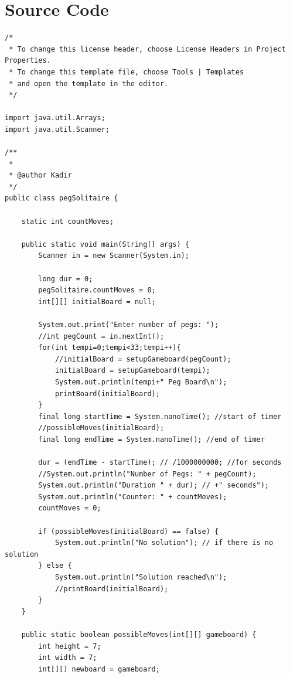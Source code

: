 \documentclass{article}
\begin{document}
\section{Source Code}
\begin{lstlisting}
/*
 * To change this license header, choose License Headers in Project Properties.
 * To change this template file, choose Tools | Templates
 * and open the template in the editor.
 */

import java.util.Arrays;
import java.util.Scanner;

/**
 *
 * @author Kadir
 */
public class pegSolitaire {

    static int countMoves;

    public static void main(String[] args) {
        Scanner in = new Scanner(System.in);

        long dur = 0;
        pegSolitaire.countMoves = 0;
        int[][] initialBoard = null;

        System.out.print("Enter number of pegs: ");
        //int pegCount = in.nextInt();
        for(int tempi=0;tempi<33;tempi++){
            //initialBoard = setupGameboard(pegCount);
            initialBoard = setupGameboard(tempi);
            System.out.println(tempi+" Peg Board\n");
            printBoard(initialBoard);
        }
        final long startTime = System.nanoTime(); //start of timer
        //possibleMoves(initialBoard);
        final long endTime = System.nanoTime(); //end of timer

        dur = (endTime - startTime); // /1000000000; //for seconds
        //System.out.println("Number of Pegs: " + pegCount);
        System.out.println("Duration " + dur); // +" seconds");
        System.out.println("Counter: " + countMoves);
        countMoves = 0;

        if (possibleMoves(initialBoard) == false) {
            System.out.println("No solution"); // if there is no solution
        } else {
            System.out.println("Solution reached\n");
            //printBoard(initialBoard);
        }
    }

    public static boolean possibleMoves(int[][] gameboard) {
        int height = 7;
        int width = 7;
        int[][] newboard = gameboard;


\end{lstlisting}
\end{document}
